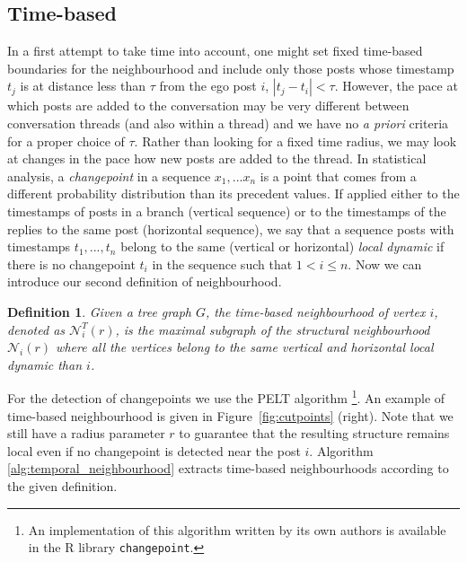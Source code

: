 \documentclass[conference]{IEEEtran}
\newtheorem{definition}{Definition}
\begin{document}
\subsection{Time-based}
In a first attempt to take time into account, one might set fixed time-based boundaries for the neighbourhood and include only those posts whose timestamp $t_j$ is at distance less than $\tau$ from the ego post $i$, $|t_j-t_i|<\tau$. However, the pace at which posts are added to the conversation may be very different between conversation threads (and also within a thread) and we have no \textit{a priori} criteria for a proper choice of $\tau$. 
Rather than looking for a fixed time radius, we may look at changes in the pace how new posts are added to the thread. In statistical analysis, a \textit{changepoint} in a sequence $x_1,...x_n$ is a point that comes from a different probability distribution than its precedent values. If applied either to the timestamps of posts in a branch (vertical sequence) or to the timestamps of the replies to the same post (horizontal sequence), we say that a sequence posts with timestamps $t_1,...,t_n$ belong to the same (vertical or horizontal) \textit{local dynamic} if there is no changepoint $t_i$ in the sequence such that $1 < i \leq n$. Now we can introduce our second definition of neighbourhood.
\begin{definition}
Given a tree graph $G$, the \textit{time-based neighbourhood} of vertex $i$, denoted as $\mathcal{N}_{i}^T(r)$, is the maximal subgraph of the structural neighbourhood $\mathcal{N}_i(r)$ where all the vertices  belong to the same vertical and horizontal local dynamic than $i$.
\end{definition}
For the detection of changepoints we use the PELT algorithm \cite{Killick2012}\footnote{An implementation of this algorithm written by its own authors is available in the R library \texttt{changepoint}.}. An example of time-based neighbourhood is given in Figure~\ref{fig:cutpoints} (right).
Note that we still have a radius parameter $r$ to guarantee that the resulting structure remains local even if no changepoint is detected near the post $i$. Algorithm \ref{alg:temporal_neighbourhood} extracts time-based neighbourhoods according to the given definition. 
\end{document}
